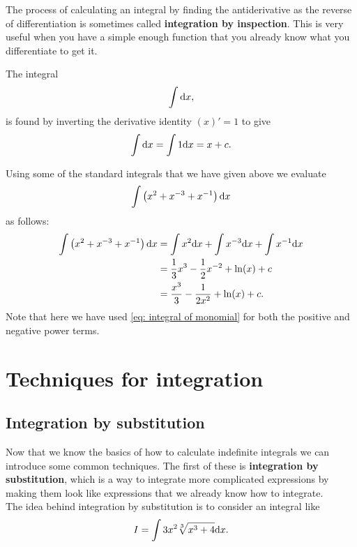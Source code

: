 The process of calculating an integral by finding the antiderivative as the reverse of differentiation is sometimes called \textbf{integration by inspection}. This is very useful when you have a simple enough function that you already know what you differentiate to get it.\\

\begin{ex}
The integral
\begin{equation*}
\int \mathrm{d} x,
\end{equation*}
is found by inverting the derivative identity $\left(x\right)'=1$ to give
\begin{equation*}
\int \mathrm{d} x=\int 1\mathrm{d} x =x+c.
\end{equation*}
\end{ex}


\begin{ex}
Using some of the standard integrals that we have given above we evaluate 
\begin{equation*}
\int \left(x^{2}+x^{-3}+x^{-1}\right)\mathrm{d} x
\end{equation*}
as follows:
\begin{align*}
\int \left(x^{2}+x^{-3}+x^{-1}\right)\mathrm{d} x&=\int x^{2}\mathrm{d} x+\int x^{-3}\mathrm{d} x+\int x^{-1}\mathrm{d} x\\
							&=\frac{1}{3}x^{3}-\frac{1}{2}x^{-2}+\ln(x) +c\\
							&=\frac{x^{3}}{3}-\frac{1}{2x^{2}}+\ln(x)+c.
\end{align*}
Note that here we have used \cref{eq: integral of monomial} for both the positive and negative power terms.
\end{ex}


\section{Techniques for integration}

\subsection*{Integration by substitution}
Now that we know the basics of how to calculate indefinite integrals we can introduce some common techniques. The first of these is \textbf{integration by substitution}, which is a way to integrate more complicated expressions by making them look like expressions that we already know how to integrate. \\

The idea behind integration by substitution is to consider an integral like
\begin{equation*}
I= \int 3x^{2}\sqrt[3]{x^{3}+4}\mathrm{d} x.
\end{equation*}

